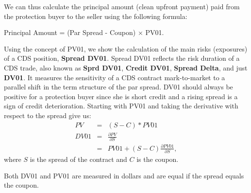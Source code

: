 \documentclass[a4paper]{article}
\begin{document}
We can thus calculate the principal amount (clean upfront payment)
paid from the protection buyer to the seller using the following
formula:
\begin{center}
  Principal Amount = (Par Spread - Coupon) $\times$ PV01.
\end{center}

Using the concept of PV01, we show the calculation of the main risks
(exposures) of a CDS position, \textbf{Spread DV01}. Spread DV01
reflects the risk duration of a CDS trade, also known as \textbf{Sprd
  DV01}, \textbf{Credit DV01}, \textbf{Spread Delta}, and just
\textbf{DV01}. 
It measures the sensitivity of a CDS contract mark-to-market to a
parallel shift in the term structure of the par spread. DV01 should
always be positive for a protection buyer since she is short credit
and a rising spread is a sign of credit deterioration. Starting with
PV01 and taking the derivative with respect to the spread give us:
\begin{eqnarray}
  PV & = & (S - C) * PV01 \nonumber \\
  DV01 & = & \frac{\partial PV}{\partial S} \nonumber \\
  & = & PV01 + (S - C) \frac{\partial PV01}{\partial S},\nonumber
\end{eqnarray}
where $S$ is the spread of the contract and $C$ is the coupon.

Both DV01 and PV01 are measured in dollars and are equal if the spread
equals the coupon. 


\end{document}
